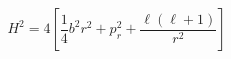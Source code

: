\begin{equation}                                
H^{2}=4[\frac{1}{4}b^{2}r^{2}+p^{2}_{r}+\frac{\ell(\ell+1)}{r^{2}}]                                
\end{equation} 
